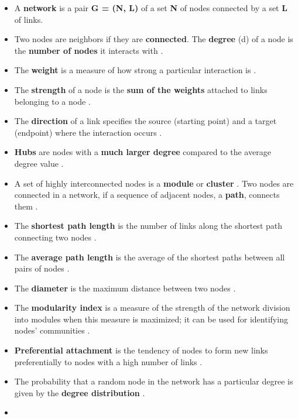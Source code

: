 \documentclass[
]{book}
\begin{document}
\begin{itemize}
\item
  A \textbf{network} is a pair \textbf{G = (N, L)} of a set \textbf{N} of nodes connected by a set \textbf{L} of links.
\item
  Two nodes are neighbors if they are \textbf{connected}. The \textbf{degree} (d) of a node is the \textbf{number of nodes} it interacts with \citep{Bondy2008GraphTheory}.
\item
  The \textbf{weight} is a measure of how strong a particular interaction is \citep{Bondy2008GraphTheory}.
\item
  The \textbf{strength} of a node is the \textbf{sum of the weights} attached to links belonging to a node \citep{Barrat2003TheNetworks}.
\item
  The \textbf{direction} of a link specifies the source (starting point) and a target (endpoint) where the interaction occurs \citep{Barabasi2016}.
\item
  \textbf{Hubs} are nodes with a \textbf{much larger degree} compared to the average degree value \citep{Barrat2003TheNetworks}.
\item
  A set of highly interconnected nodes is a \textbf{module} or \textbf{cluster} \citep{Li2009}. Two nodes are connected in a network, if a sequence of adjacent nodes, a \textbf{path}, connects them \citep{barabasi2004network}.
\item
  The \textbf{shortest path length} is the number of links along the shortest path connecting two nodes \citep{barabasi2004network}.
\item
  The \textbf{average path length} is the average of the shortest paths between all pairs of nodes \citep{barabasi2004network}.
\item
  The \textbf{diameter} is the maximum distance between two nodes \citep{Bondy2008GraphTheory}.
\item
  The \textbf{modularity index} is a measure of the strength of the network division into modules when this measure is maximized; it can be used for identifying nodes' communities \citep{Newman2018}.
\item
  \textbf{Preferential attachment} is the tendency of nodes to form new links preferentially to nodes with a high number of links \citep{barabasi1999emergence, Vazquez2003GrowingCorrelations}.
\item
  The probability that a random node in the network has a particular degree is given by the \textbf{degree distribution} \citep{barabasi2004network}.
\item

\end{itemize}
\end{document}

